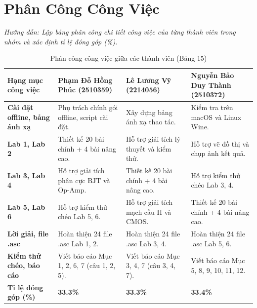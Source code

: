 \documentclass[12pt,a4paper]{report}
\begin{document}
\chapter{Phân Công Công Việc}

\textit{\color{guidegray}
Hướng dẫn: Lập bảng phân công chi tiết công việc của từng thành viên trong nhóm và xác định tỉ lệ đóng góp (\%).
}

\begin{table}[H]
\centering
\caption{Phân công công việc giữa các thành viên (Bảng 15)}
\label{tab:bang15_phancong}
\renewcommand{\arraystretch}{1.3}
\begin{tabularx}{\textwidth}{|p{5.5cm}|X|X|X|}
\hline
\rowcolor{codebg}
\textbf{Hạng mục công việc} & \textbf{Phạm Đỗ Hồng Phúc (2510359)} & \textbf{Lê Lương Vỹ (2214056)} & \textbf{Nguyễn Bảo Duy Thành (2510372)} \\ \hline
\textbf{Cài đặt offline, bảng ánh xạ} & Phụ trách chính gói offline, script cài đặt. & Xây dựng bảng ánh xạ thao tác. & Kiểm tra trên macOS và Linux Wine. \\ \hline
\textbf{Lab 1, Lab 2} & Thiết kế 20 bài chính + 4 bài nâng cao. & Hỗ trợ giải tích lý thuyết và kiểm thử. & Hỗ trợ vẽ đồ thị và chụp ảnh kết quả. \\ \hline
\textbf{Lab 3, Lab 4} & Hỗ trợ giải tích phân cực BJT và Op-Amp. & Thiết kế 20 bài chính + 4 bài nâng cao. & Hỗ trợ kiểm thử chéo Lab 3, 4. \\ \hline
\textbf{Lab 5, Lab 6} & Hỗ trợ kiểm thử chéo Lab 5, 6. & Hỗ trợ giải tích mạch cầu H và CMOS. & Thiết kế 20 bài chính + 4 bài nâng cao. \\ \hline
\textbf{Lời giải, file .asc} & Hoàn thiện 24 file .asc Lab 1, 2. & Hoàn thiện 24 file .asc Lab 3, 4. & Hoàn thiện 24 file .asc Lab 5, 6. \\ \hline
\textbf{Kiểm thử chéo, báo cáo} & Viết báo cáo Mục 1, 2, 6, 7 (câu 1, 2, 5). & Viết báo cáo Mục 3, 4, 7 (câu 3, 4, 7). & Viết báo cáo Mục 5, 8, 9, 10, 11, 12. \\ \hline
\hline
\rowcolor{codebg}
\textbf{Tỉ lệ đóng góp (\%)} & \textbf{33.3\%} & \textbf{33.3\%} & \textbf{33.4\%} \\ \hline
\end{tabularx}
\end{table}

\end{document}
